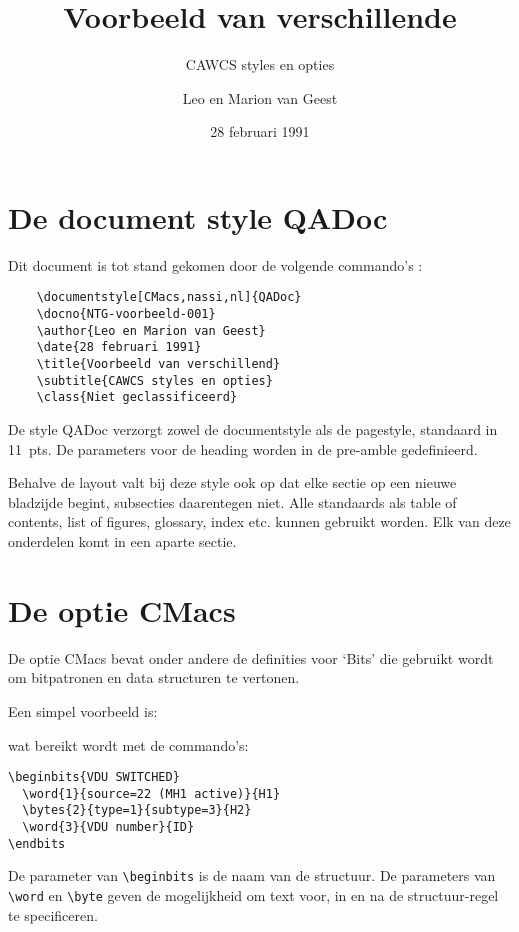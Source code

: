 \author{Leo en Marion van Geest}
\date{28 februari 1991}
\title{Voorbeeld van verschillende}
\subtitle{CAWCS styles en opties}


\section{De document style QADoc}

Dit document is tot stand gekomen door de volgende commando's :

\begin{verbatim}
    \documentstyle[CMacs,nassi,nl]{QADoc}
    \docno{NTG-voorbeeld-001}
    \author{Leo en Marion van Geest}
    \date{28 februari 1991}
    \title{Voorbeeld van verschillend}
    \subtitle{CAWCS styles en opties}
    \class{Niet geclassificeerd}
\end{verbatim}

De style QADoc verzorgt zowel de documentstyle als de pagestyle, standaard in
11~pts. De parameters voor de heading worden in de pre-amble gedefinieerd.

Behalve de layout valt bij deze style ook op dat elke sectie op een nieuwe
bladzijde begint, subsecties daarentegen niet. Alle standaards als table of
contents, list of figures, glossary, index etc. kunnen gebruikt worden. Elk van
deze onderdelen komt in een aparte sectie.

\section{De optie CMacs}
De optie CMacs bevat onder andere de definities voor `Bits' die gebruikt wordt
om bitpatronen en data structuren te vertonen.

Een simpel voorbeeld is:

\endbits

wat bereikt wordt met de commando's:

\begin{verbatim}
\beginbits{VDU SWITCHED}
  \word{1}{source=22 (MH1 active)}{H1}
  \bytes{2}{type=1}{subtype=3}{H2}
  \word{3}{VDU number}{ID}
\endbits
\end{verbatim}

De parameter van \verb"\beginbits" is de naam van de structuur. De parameters
van \verb"\word" en \verb"\byte" geven de mogelijkheid om text voor, in en na de
structuur-regel te specificeren.


